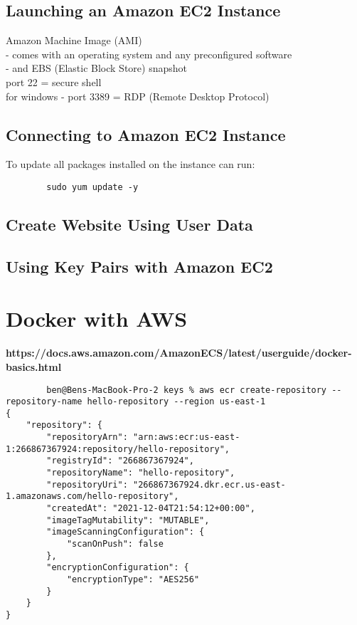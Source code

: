 \documentclass[11pt]{article}
\begin{document}
    \subsection{Launching an Amazon EC2 Instance}
    Amazon Machine Image (AMI)
    \\
    - comes with an operating system and any preconfigured software
    \\
    - and EBS (Elastic Block Store) snapshot
    \\
    port 22 = secure shell
    \\
    for windows - port 3389 = RDP (Remote Desktop Protocol)

    \subsection{Connecting to Amazon EC2 Instance}


    To update all packages installed on the instance can run:
    \begin{lstlisting}
        sudo yum update -y
    \end{lstlisting}

    \subsection{Create Website Using User Data}

    \subsection{Using Key Pairs with Amazon EC2}


    \section{Docker with AWS}
    \textbf{https://docs.aws.amazon.com/AmazonECS/latest/userguide/docker-basics.html}

    \begin{lstlisting}
        ben@Bens-MacBook-Pro-2 keys % aws ecr create-repository --repository-name hello-repository --region us-east-1
{
    "repository": {
        "repositoryArn": "arn:aws:ecr:us-east-1:266867367924:repository/hello-repository",
        "registryId": "266867367924",
        "repositoryName": "hello-repository",
        "repositoryUri": "266867367924.dkr.ecr.us-east-1.amazonaws.com/hello-repository",
        "createdAt": "2021-12-04T21:54:12+00:00",
        "imageTagMutability": "MUTABLE",
        "imageScanningConfiguration": {
            "scanOnPush": false
        },
        "encryptionConfiguration": {
            "encryptionType": "AES256"
        }
    }
}
    \end{lstlisting}
\end{document}

